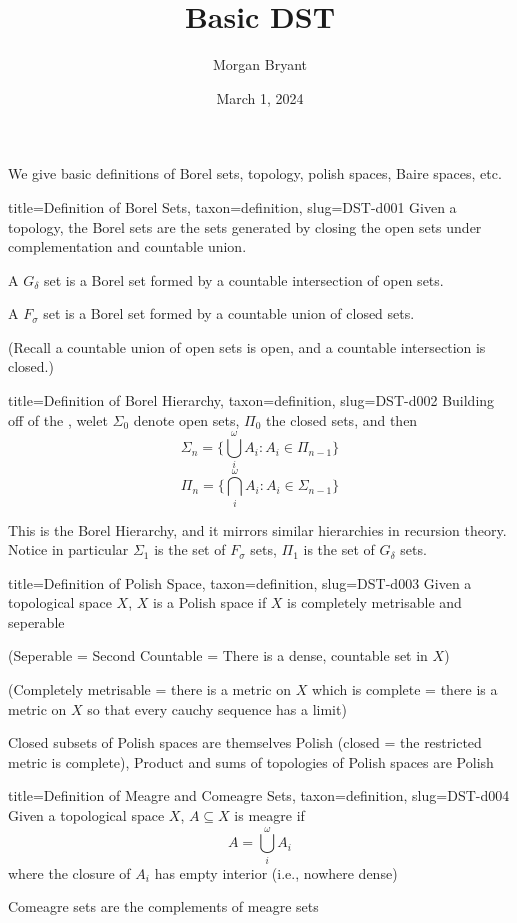 \documentclass[a4paper]{article}
\title{Basic DST}
\date{March 1, 2024}
\author{Morgan Bryant}
\begin{document}
\maketitle
\par{We give basic definitions of Borel sets, topology, polish spaces, Baire spaces, etc.}
\begin{tree}{title={Definition of Borel Sets}, taxon={definition}, slug={DST-d001}}
Given a topology, the Borel sets are the sets generated by closing the open sets under complementation and countable union.\par{A \(G_ \delta\) set is a Borel set formed by a countable intersection of open sets.}\par{A \(F_ \sigma\) set is a Borel set formed by a countable union of closed sets.}\par{(Recall a countable union of open sets is open, and a countable intersection is closed.)}
\end{tree}

\begin{tree}{title={Definition of Borel Hierarchy}, taxon={definition}, slug={DST-d002}}
Building off of the , welet \(\Sigma _0\) denote open sets, \(\Pi _0\) the closed sets, and then 
\[\Sigma _n =  \{ \bigcup _i^ \omega  A_i : A_i  \in   \Pi _{n-1} \}\]
\[\Pi _n =  \{ \bigcap _i^ \omega  A_i : A_i  \in   \Sigma _{n-1} \}\]\par{This is the Borel Hierarchy, and it mirrors similar hierarchies in recursion theory. 
Notice in particular \(\Sigma _1\) is the set of \(F_ \sigma\) sets, \(\Pi _1\) is the set of \(G_ \delta\) sets. }
\end{tree}

\begin{tree}{title={Definition of Polish Space}, taxon={definition}, slug={DST-d003}}
Given a topological space \(X\), \(X\) is a Polish space if \(X\) is completely metrisable and seperable\par{(Seperable = Second Countable = There is a dense, countable set in \(X\))}\par{(Completely metrisable = there is a metric on \(X\) which is complete = there is a metric on \(X\) so that every cauchy sequence 
has a limit)}\par{Closed subsets of Polish spaces are themselves Polish (closed = the restricted metric is complete), Product and sums of topologies of Polish spaces are Polish}
\end{tree}

\begin{tree}{title={Definition of Meagre and Comeagre Sets}, taxon={definition}, slug={DST-d004}}
Given a topological space \(X\), \(A \subseteq  X\) is meagre if \[A =  \bigcup _i^ \omega  A_i\] where the closure of \(A_i\) has empty interior (i.e., nowhere dense)\par{Comeagre sets are the complements of meagre sets}
\end{tree}

\printbibliography
\end{document}
